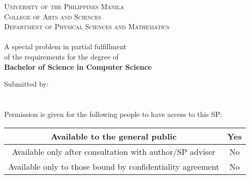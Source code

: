 \begin{titlepage}

\begin{center}



\textsc{\large University of the Philippines Manila}\\
\textsc{\large College of Arts and Sciences}\\
\textsc{\large Department of Physical Sciences and Mathematics}\\[3.5cm]

\textsc{\Large \MyTitle}\\[3.5cm]

A special problem in partial fulfillment\\
of the requirements for the degree of\\
\textbf{Bachelor of Science in Computer Science}


\vfill

Submitted by:\\[1.25cm]
\MyAuthor\\
{\MyDate}
\\[1cm]
Permission is given for the following people to have access to this SP:
\\[0.5cm]
\begin{tabular}{|c|c|}
	\hline
	Available to the general public & Yes \\
	\hline
	Available only after consultation with author/SP adviser & No \\
	\hline
	Available only to those bound by confidentiality agreement & No \\
	\hline
\end{tabular}

\end{center}

\end{titlepage}